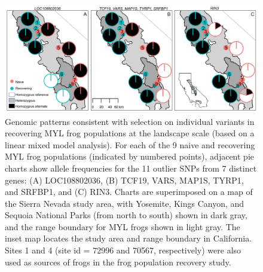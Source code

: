 \documentclass[9pt,twocolumn,twoside,lineno]{pnas-new}
\begin{document}
\begin{figure}

{\centering \includegraphics[width=\textwidth]{figures/allele_maps.png}

}

\caption{\label{fig-allelefrequencies}Genomic patterns consistent with
selection on individual variants in recovering MYL frog populations at
the landscape scale (based on a linear mixed model analysis). For each
of the 9 naive and recovering MYL frog populations (indicated by
numbered points), adjacent pie charts show allele frequencies for the 11
outlier SNPs from 7 distinct genes: (A) LOC108802036, (B) TCF19, VARS,
MAP1S, TYRP1, and SRFBP1, and (C) RIN3. Charts are superimposed on a map
of the Sierra Nevada study area, with Yosemite, Kings Canyon, and
Sequoia National Parks (from north to south) shown in dark gray, and the
range boundary for MYL frogs shown in light gray. The inset map locates
the study area and range boundary in California. Sites 1 and 4 (site id
= 72996 and 70567, respectively) were also used as sources of frogs in
the frog population recovery study.}

\end{figure}

\newpage
\end{document}
